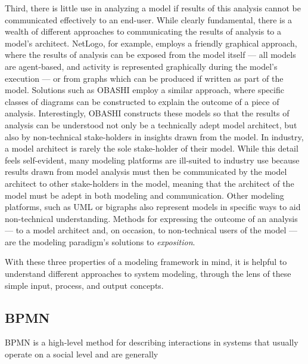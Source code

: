 \documentclass[draft,12pt]{article}
\begin{document}
Third, there is little use in analyzing a model if results of this analysis
cannot be communicated effectively to an end-user. While clearly fundamental,
there is a wealth of different approaches to communicating the results of
analysis to a model's architect. NetLogo\citep{tisue2004netlogo}, for example,
employs a friendly graphical approach, where the results of analysis can be
exposed from the model itself --- all models are agent-based, and activity is
represented graphically during the model's execution --- or from graphs which
can be produced if written as part of the model. Solutions such as
OBASHI\citep{obashimethodology} employ a similar approach, where specific
classes of diagrams can be constructed to explain the outcome of a piece of
analysis. Interestingly, OBASHI constructs these models so that the results of
analysis can be understood not only be a technically adept model architect, but
also by non-technical stake-holders in insights drawn from the model. In
industry, a model architect is rarely the sole stake-holder of their model.
While this detail feels self-evident, many modeling platforms are ill-suited to
industry use because results drawn from model analysis must then be communicated
by the model architect to other stake-holders in the model, meaning that the
architect of the model must be adept in both modeling and communication. Other
modeling platforms, such as UML\citep{rumbaugh2017unified} or
bigraphs\citep{milner2009space} also represent models in specific ways to aid
non-technical understanding.
Methods for expressing the outcome of an analysis
--- to a model architect and, on occasion, to non-technical users of the model
--- are the modeling paradigm's solutions to \emph{exposition}.\par

With these three properties of a modeling framework in mind, it is helpful to
understand different approaches to system modeling, through the lens of these
simple input, process, and output concepts.


\subsection{BPMN}

BPMN is a high-level method for describing interactions in systems that usually
operate on a social level and are generally 
\end{document}
